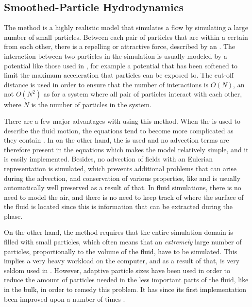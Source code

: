\subsection{Smoothed-Particle Hydrodynamics}

The \SPH method is a highly realistic model that simulates a flow by simulating a large number of small particles. Between each pair of particles that are within a certain  from each other, there is a repelling or attractive force, described by an \ODE. The interaction between two particles in the simulation is usually modeled by a potential like those used in \MD, for example a \LJ potential that has been softened to limit the maximum acceleration that particles can be exposed to. The cut-off distance is used in order to ensure that the number of interactions is $O(N)$, an not $O(N^2)$ as for a system where all pair of particles interact with each other, where $N$ is the number of particles in the system.

There are a few major advantages with using this method. When the  is used to describe the fluid motion, the equations tend to become more complicated as they contain . In \SPH on the other hand, the  is used and no advection terms are therefore present in the equations which makes the model relatively simple, and it is easily implemented. Besides, no advection of fields with an Eulerian representation is simulated, which prevents additional problems that can arise during the advection, and conservation of various properties, like \momentum and \energy is usually automatically well preserved as a result of that. In fluid simulations, there is no need to model the air, and there is no need to keep track of where the surface of the fluid is located since this is information that can be extracted during the  phase.

On the other hand, the \SPH method requires that the entire simulation domain is filled with small particles, which often means that an \emph{extremely} large number of particles, proportionally to the volume of the fluid, have to be simulated. This implies a very heavy workload on the computer, and as a result of that, \SPH is very seldom used in . However, adaptive particle sizes have been used in order to reduce the amount of particles needed in the less important parts of the fluid, like in the bulk, in order to remedy this problem. It has since its first implementation \citep{Desbrun1999} been improved upon a number of times \citep[e.g.][]{Yan2009}.

